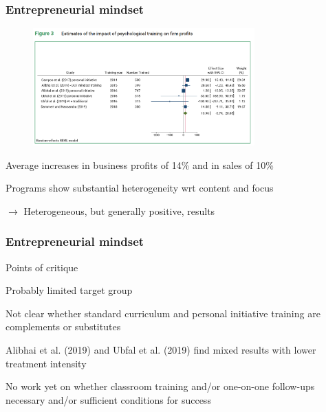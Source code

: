 \documentclass[hideothersubsections, usenames,dvipsnames,11pt]{beamer}
\newenvironment{itemize_2pt}{\itemize\addtolength{\itemsep}{2pt}}{\enditemize}
\begin{document}
\begin{frame}
\frametitle{Entrepreneurial mindset}

\begin{figure}[htbp]
	\centering
	\includegraphics[width=23em]{pics/McKenzie2020_mindset.png}
	\label{McKenzie (2020): Mindset}
\end{figure}

\vspace{-1.0em}

\begin{itemize_2pt}
	\item \textcolor{bdf}{Average increases in business profits of 14\% and in sales of 10\%}
	\item Programs show \textcolor{bdf}{substantial heterogeneity} wrt content and focus
	\item[] $\rightarrow$ Heterogeneous, but generally positive, results
\end{itemize_2pt}
\end{frame}

\begin{frame}
\frametitle{Entrepreneurial mindset}

Points of critique
\begin{itemize_2pt}
	\item \textcolor{bdf}{Probably limited target group}
	\item Not clear whether standard curriculum and personal initiative training are \textcolor{bdf}{complements or substitutes}
	\item \textcolor{camel}{Alibhai et al. (2019)} and \textcolor{camel}{Ubfal et al. (2019)} find \textcolor{bdf}{mixed results with lower treatment intensity}
	\item No work yet on whether \textcolor{bdf}{classroom training and/or one-on-one follow-ups} necessary and/or sufficient conditions for success
\end{itemize_2pt}
\end{frame}

\end{document}
